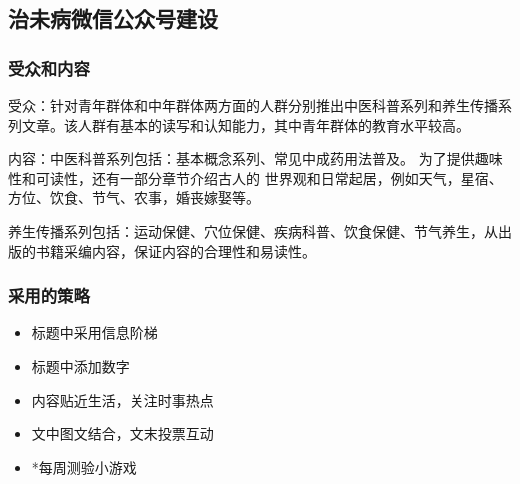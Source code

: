 \subsection{治未病微信公众号建设}
\subsubsection{受众和内容}

受众：针对青年群体和中年群体两方面的人群分别推出中医科普系列和养生传播系列文章。该人群有基本的读写和认知能力，其中青年群体的教育水平较高。

内容：中医科普系列包括：基本概念系列、常见中成药用法普及。
为了提供趣味性和可读性，还有一部分章节介绍古人的
世界观和日常起居，例如天气，星宿、方位、饮食、节气、农事，婚丧嫁娶等。

养生传播系列包括：运动保健、穴位保健、疾病科普、饮食保健、节气养生，从出版的书籍采编内容，保证内容的合理性和易读性。

\subsubsection{采用的策略}

\begin{itemize}
    \item 标题中采用信息阶梯
    \item 标题中添加数字
    \item 内容贴近生活，关注时事热点
    \item 文中图文结合，文末投票互动
    \item *每周测验小游戏
\end{itemize}


